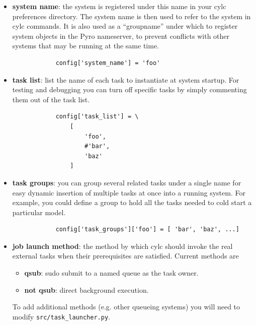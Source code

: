 \documentclass[11pt,a4paper]{article}
\begin{document}
\begin{itemize} \item {\bf system name}: the system is registered under
        this name in your cylc preferences directory. The system name is
        then used to refer to the system in cylc commands. It is also
        used as a ``groupname'' under which to register system objects 
        in the Pyro nameserver, to prevent conflicts with other systems
        that may be running at the same time.

        \begin{lstlisting}
            config['system_name'] = 'foo'
        \end{lstlisting}

    \item {\bf task list}: list the name of each task to instantiate at
        system startup.  For testing and debugging you can turn off
        specific tasks by simply commenting them out of the task list.
        
        \begin{lstlisting}
            config['task_list'] = \
                [
                    'foo',
                    #'bar',
                    'baz'
                ]
        \end{lstlisting}


    \item {\bf task groups}: you can group several related tasks under a
        single name for easy dynamic insertion of multiple tasks at
        once into a running system. For example, you could define a 
        group to hold all the tasks needed to cold start a particular
        model.

        \begin{lstlisting}
            config['task_groups']['foo'] = [ 'bar', 'baz', ...]
        \end{lstlisting}

    \item {\bf job launch method}: the method by which cylc should
        invoke the real external tasks when their prerequisites are
        satisfied. Current methods are
        \begin{itemize}
            \item {\bf qsub}: sudo submit to a named queue as the task
                owner.  
            \item {\bf not qsub}: direct background execution.
        \end{itemize}
        To add additional methods (e.g. other queueing systems) you
        will need to modify \lstinline{src/task_launcher.py}.


\end{itemize}
\end{document}
